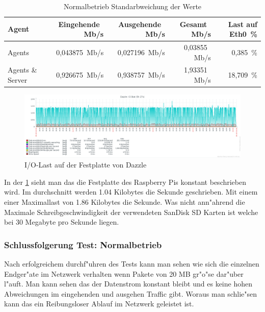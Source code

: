 \begin{table}
\centering
\begin{tabular}{l%
 r<{\,Mb/s}%
 r<{\,Mb/s}%
 r<{\,Mb/s}%
 r<{\,\%}%
}
Agent		& Eingehende            & Ausgehende            & Gesamt                & Last auf Eth0 \\
\hline
Agents		& 0,043875              & 0,027196              & 0,03855               &  0,385          \\
Agents \& Server& 0,926675		& 0,938757        	& 1,93351              & 18,709         \\
\end{tabular}
\caption{Normalbetrieb Standarbweichung der Werte}
\label{tab:standardTrafficAbweichung}
\end{table}


\begin{figure}[htbp]
\centering
\includegraphics*[width=0.9\linewidth]{Abb/ZabbixDazzle/Standard/IoStatDazzleStandard}

\caption{I/O-Last auf der Festplatte von Dazzle}
\label{fig:IoStatDazzleStandard}
\end{figure}

In der \cref{fig:IoStatDazzleStandard} sieht man das die Festplatte des Raspberry Pis konstant beschrieben wird. Im durchschnitt werden 1.04 Kilobytes %
die Sekunde geschrieben. Mit einem einer Maximallast von 1.86 Kilobytes die Sekunde. Was nicht ann"ahrend die Maximale Schreibgeschwindigkeit der verwendeten %
SanDisk SD Karten ist welche bei 30 Megabyte\autocite{san:sd} pro Sekunde liegen. 

\subsubsection{Schlussfolgerung Test: Normalbetrieb}
\label{subsubsec:schlussfolgerung:normalbetrieb}
Nach erfolgreichem durchf"uhren des Tests kann man sehen wie sich die einzelnen Endger"ate im Netzwerk verhalten wenn Pakete von 20 MB gr"o"se dar"uber l"auft. %
Man kann sehen das der Datenstrom konstant bleibt und es keine hohen Abweichungen im eingehenden und ausgehen Traffic gibt. Woraus man schlie"sen kann das %
ein Reibungsloser Ablauf im Netzwerk geleistet ist. 




